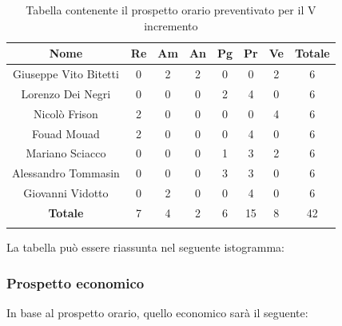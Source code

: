 			\begin{longtable}{|c|c|c|c|c|c|c|c}
				\hline
				\rowcolor{lighter-grayer}
				\textbf{Nome} & \textbf{Re} & \textbf{Am} & \textbf{An} & \textbf{Pg}  & \textbf{Pr}   & \textbf{Ve} & \textbf{Totale} \\
				\hline
				\endfirsthead
				\hline
				Giuseppe Vito Bitetti & 0 & 2 & 2 & 0 & 0 & 2 & 6\\
				\hline
				\hline
				Lorenzo Dei Negri & 0 & 0 & 0 & 2 & 4 & 0 & 6\\
				\hline
				\hline
				Nicolò Frison & 2 & 0 & 0 & 0 & 0 & 4 & 6\\
				\hline
				\hline
				Fouad Mouad & 2 & 0 & 0 & 0 & 4 & 0 & 6\\
				\hline
				\hline
				Mariano Sciacco & 0 & 0 & 0 & 1 & 3 & 2 & 6\\
				\hline
				\hline
				Alessandro Tommasin & 0 & 0 & 0 & 3 & 3 & 0 & 6\\
				\hline
				\hline
				Giovanni Vidotto & 0 & 2 & 0 & 0 & 4 & 0 & 6\\
				\hline 
				\textbf{Totale} & 7 & 4 & 2 & 6 & 15 & 8 & 42 \\
				\hline 
				
				\caption{Tabella contenente il prospetto orario preventivato per il V incremento}
			\end{longtable}
			\pagebreak	
			
			La tabella può essere riassunta nel seguente istogramma:
			
			
		\subsubsection{Prospetto economico}
			In base al prospetto orario, quello economico sarà il seguente: 
			
